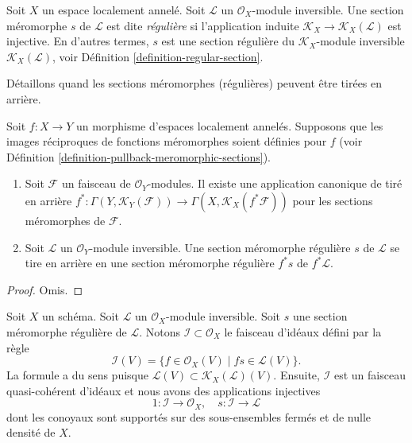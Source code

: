 \begin{definition}
\label{definition-regular-meromorphic-section}
Soit  $X$  un espace localement annelé. Soit  $\mathcal{L}$  un
 $\mathcal{O}_X$-module inversible. Une section méromorphe  $s$  de
 $\mathcal{L}$  est dite  {\it  régulière}  si
l'application induite  $\mathcal{K}_X \to \mathcal{K}_X(\mathcal{L})$  est injective. En d'autres termes,  $s$ 
est une section régulière du  $\mathcal{K}_X$-module inversible  $\mathcal{K}_X(\mathcal{L})$, voir
Définition  \ref{definition-regular-section}.
\end{definition}

\noindent
Détaillons quand les sections méromorphes (régulières) peuvent être tirées en
arrière.

\begin{lemma}
\label{lemma-meromorphic-sections-pullback}
Soit  $f : X \to Y$  un morphisme d'espaces localement annelés. Supposons que les
images réciproques de fonctions méromorphes soient définies pour  $f$ 
(voir Définition  \ref{definition-pullback-meromorphic-sections}).
\begin{enumerate}
\item Soit  $\mathcal{F}$  un faisceau de  $\mathcal{O}_Y$-modules. Il existe une application
canonique de tiré en arrière  $f^* : \Gamma(Y, \mathcal{K}_Y(\mathcal{F})) \to
\Gamma(X, \mathcal{K}_X(f^*\mathcal{F}))$  pour les sections méromorphes de
 $\mathcal{F}$.
\item Soit  $\mathcal{L}$  un  $\mathcal{O}_Y$-module inversible. Une section méromorphe
régulière  $s$  de  $\mathcal{L}$  se tire en arrière en une section
méromorphe régulière  $f^*s$  de  $f^*\mathcal{L}$.
\end{enumerate}
\end{lemma}

\begin{proof}
Omis.
\end{proof}

\begin{lemma}
\label{lemma-regular-meromorphic-ideal-denominators}
Soit  $X$  un schéma. Soit  $\mathcal{L}$  un  $\mathcal{O}_X$-module inversible.
Soit  $s$  une section méromorphe régulière de  $\mathcal{L}$. Notons
 $\mathcal{I} \subset \mathcal{O}_X$  le faisceau d'idéaux défini par la règle
$$
\mathcal{I}(V)
=
\{f \in \mathcal{O}_X(V) \mid fs \in \mathcal{L}(V)\}.
$$
La formule a du sens puisque  $\mathcal{L}(V) \subset \mathcal{K}_X(\mathcal{L})(V)$. Ensuite,  $\mathcal{I}$  est un faisceau
quasi-cohérent d'idéaux et nous avons des applications injectives
$$
1 : \mathcal{I} \longrightarrow \mathcal{O}_X,
\quad
s : \mathcal{I} \longrightarrow \mathcal{L}
$$
dont les conoyaux sont supportés sur des sous-ensembles fermés et de nulle densité
de  $X$.
\end{lemma}


